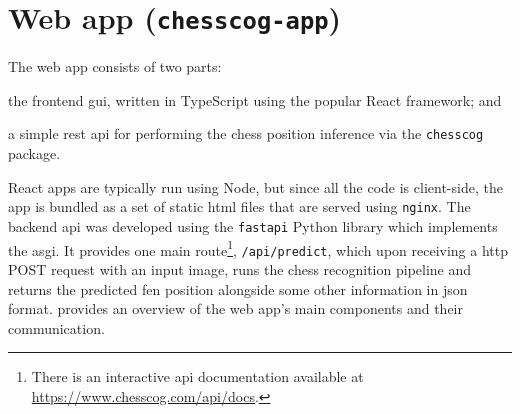 \documentclass[../report.tex]{subfiles}
\begin{document}
\section{Web app (\texttt{chesscog-app})}
\label{sec:implementation_chesscogapp}
The web app consists of two parts:
\begin{enumerate*}[label=(\roman*)]
    \item the frontend \gls{gui}, written in TypeScript using the popular React framework; and
    \item a simple \gls{rest} \gls{api} for performing the chess position inference via the \texttt{chesscog} package.
\end{enumerate*}
React apps are typically run using Node, but since all the code is client-side, the app is bundled as a set of static \gls{html} files that are served using \texttt{nginx}.
The backend \gls{api} was developed using the \texttt{fastapi} Python library which implements the \gls{asgi}.
It provides one main route\footnote{There is an interactive \gls{api} documentation available at \url{https://www.chesscog.com/api/docs}.}, \texttt{/api/predict}, which upon receiving a \gls{http} POST request with an input image, runs the chess recognition pipeline and returns the predicted \gls{fen} position alongside some other information in \gls{json} format.
 provides an overview of the web app's main components and their communication.
\end{document}
